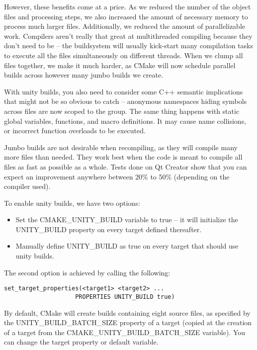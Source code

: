 However, these benefits come at a price. As we reduced the number of the object files and processing steps, we also increased the amount of necessary memory to process much larger files. Additionally, we reduced the amount of parallelizable work. Compilers aren't really that great at multithreaded compiling because they don't need to be – the buildsystem will usually kick-start many compilation tasks to execute all the files simultaneously on different threads. When we clump all files together, we make it much harder, as CMake will now schedule parallel builds across however many jumbo builds we create.

With unity builds, you also need to consider some C++ semantic implications that might not be so obvious to catch – anonymous namespaces hiding symbols across files are now scoped to the group. The same thing happens with static global variables, functions, and macro definitions. It may cause name collisions, or incorrect function overloads to be executed.

Jumbo builds are not desirable when recompiling, as they will compile many more files than needed. They work best when the code is meant to compile all files as fast as possible as a whole. Tests done on Qt Creator show that you can expect an improvement anywhere between 20\% to 50\% (depending on the compiler used).

To enable unity builds, we have two options:

\begin{itemize}
\item 
Set the CMAKE\_UNITY\_BUILD variable to true – it will initialize the UNITY\_BUILD property on every target defined thereafter.

\item 
Manually define UNITY\_BUILD as true on every target that should use unity builds.
\end{itemize}

The second option is achieved by calling the following:

\begin{lstlisting}[style=styleCMake]
set_target_properties(<target1> <target2> ...
					PROPERTIES UNITY_BUILD true)
\end{lstlisting}

By default, CMake will create builds containing eight source files, as specified by the UNITY\_BUILD\_BATCH\_SIZE property of a target (copied at the creation of a target from the CMAKE\_UNITY\_BUILD\_BATCH\_SIZE variable). You can change the target property or default variable.

